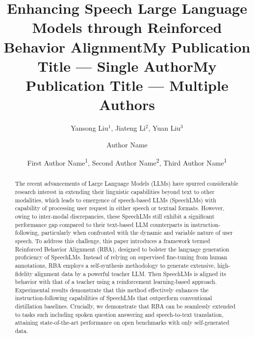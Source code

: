 \documentclass[letterpaper]{article} %
\title{Enhancing Speech Large Language Models through Reinforced \\ Behavior Alignment}
\author{Yansong Liu$^1$, Jiateng Li$^2$, Yuan Liu$^3$
}
\title{My Publication Title --- Single Author}
\author {
    Author Name
}
\title{My Publication Title --- Multiple Authors}
\author {
    First Author Name\textsuperscript{\rm 1},
    Second Author Name\textsuperscript{\rm 2},
    Third Author Name\textsuperscript{\rm 1}
}
\begin{document}
\maketitle

\begin{abstract}
The recent advancements of Large Language Models (LLMs) have spurred considerable research interest in extending their linguistic capabilities beyond text to other modalities, which leads to emergence of speech-based LLMs (SpeechLMs) with capability of processing user request in either speech or textual formats. However, owing to inter-modal discrepancies, these SpeechLMs still exhibit a significant performance gap compared to their text-based LLM counterparts in instruction-following, particularly when confronted with the dynamic and variable nature of user speech. To address this challenge, this paper introduces a framework termed Reinforced Behavior Alignment (RBA), designed to bolster the language generation proficiency of SpeechLMs. Instead of relying on supervised fine-tuning from human annotations, RBA employs a self-synthesis methodology to generate extensive, high-fidelity alignment data by a powerful teacher LLM. Then SpeechLMs is aligned its behavior with that of a teacher using a reinforcement learning-based approach. Experimental results demonstrate that this method effectively enhances the instruction-following capabilities of SpeechLMs that outperform conventional distillation baselines. Crucially, we demonstrate that RBA can be seamlessly extended to tasks such including spoken question answering and speech-to-text translation, attaining state-of-the-art performance on open benchmarks with only self-generated data.
\end{abstract}
\end{document}
